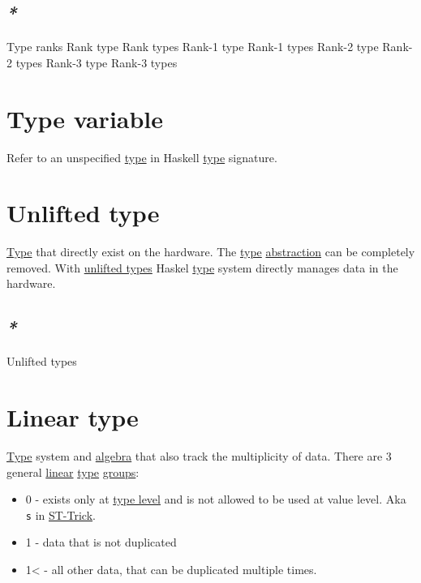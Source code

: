 \documentclass[a4paper,14pt,oneside]{book}
\begin{document}
\subsection{\emph{*}}
\label{sec:orgccaa8fe}

\label{orgeac5856}Type ranks
\label{org532ccb7}Rank type
\label{org2bb33ad}Rank types
\label{org99403f0}Rank-1 type
\label{org2929e83}Rank-1 types
\label{org9b9f84e}Rank-2 type
\label{orgd554325}Rank-2 types
\label{org0e63634}Rank-3 type
\label{org43a1001}Rank-3 types

\section{\label{orgc56d5a2}Type variable}
\label{sec:org71d16d2}
Refer to an unspecified \hyperref[orgde40363]{type} in Haskell \hyperref[orgde40363]{type} signature.

\section{\label{org48ef190}Unlifted type}
\label{sec:org3273e9e}
\hyperref[orgde40363]{Type} that directly exist on the hardware. The \hyperref[orgde40363]{type} \hyperref[org550217a]{abstraction} can be completely removed.
With \hyperref[orge32fa55]{unlifted types} Haskel \hyperref[orgde40363]{type} system directly manages data in the hardware.

\subsection{\emph{*}}
\label{sec:orgc10e16d}

\label{orge32fa55}Unlifted types

\section{\label{org5e1b05a}Linear type}
\label{sec:org7b2b315}
\hyperref[orgde40363]{Type} system and \hyperref[orgefdcb85]{algebra} that also track the multiplicity of data.
There are 3 general \hyperref[org5ebe552]{linear} \hyperref[orgde40363]{type} \hyperref[orgf3ac066]{groups}:
\begin{itemize}
\item 0 - exists only at \hyperref[orge4c5aec]{type level} and is not allowed to be used at value level. Aka \texttt{s} in \hyperref[orgac81170]{ST-Trick}.
\item 1 - data that is not duplicated
\item 1< - all other data, that can be duplicated multiple times.
\end{itemize}
\end{document}
